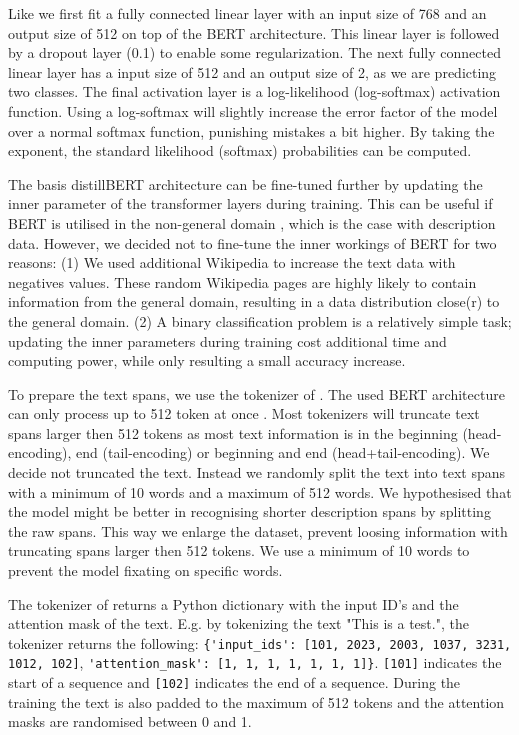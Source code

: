 \documentclass[a4paper, 12pt, oneside]{book} %
\begin{document}
Like \textcite{sun_how_2020} we first fit a fully connected linear layer with an input size of 768 and an output size of 512 on top of the BERT architecture. 
This linear layer is followed by a dropout layer (0.1) to enable some regularization.
The next fully connected linear layer has a input size of 512 and an output size of 2, as we are predicting two classes.
The final activation layer is a log-likelihood (log-softmax) activation function.
Using a log-softmax will slightly increase the error factor of the model over a normal softmax function, punishing mistakes a bit higher.
By taking the exponent, the standard likelihood (softmax) probabilities can be computed.

The basis distillBERT architecture can be fine-tuned further by updating the inner parameter of the transformer layers during training. 
This can be useful if BERT is utilised in the non-general domain \autocite{devlin_bert_2019, sun_how_2020, sanh_distilbert_2020}, which is the case with description data.
However, we decided not to fine-tune the inner workings of BERT for two reasons: 
(1) We used additional Wikipedia to increase the text data with negatives values.
These random Wikipedia pages are highly likely to contain information from the general
domain, resulting in a  data distribution close(r) to the general domain.
(2) A binary classification problem is a relatively simple task; updating the inner parameters during training cost additional time and computing power, while only resulting a small accuracy increase.

To prepare the text spans, we use the tokenizer of \textcite{wolf_huggingfaces_2020}.
The used BERT architecture can only process up to 512 token at once \autocite{sanh_distilbert_2020, devlin_bert_2019}.
Most tokenizers will truncate text spans larger then 512 tokens as most text information is in the beginning (head-encoding), end (tail-encoding) or beginning and end (head+tail-encoding).
We decide not truncated the text.
Instead we randomly split the text into text spans with a minimum of 10 words and a maximum of 512 words.
We hypothesised that the model might be better in recognising shorter description spans by splitting the raw spans.  
This way we enlarge the dataset, prevent loosing information with truncating spans larger then 512 tokens. 
We use a minimum of 10 words to prevent the model fixating on specific words.

The tokenizer of \textcite{wolf_huggingfaces_2020} returns a Python dictionary with the input ID's and the attention mask of the text.
E.g. by tokenizing the text "This is a test.", the tokenizer returns the following:
\verb|{'input_ids': [101, 2023, 2003, 1037, 3231, 1012, 102]|, 
\verb|'attention_mask': [1, 1, 1, 1, 1, 1, 1]}|.
\verb|[101]| indicates the start of a sequence and \verb|[102]| indicates the end of a sequence.
During the training the text is also padded to the maximum of 512 tokens and the attention masks are randomised between 0 and 1.
\end{document}
